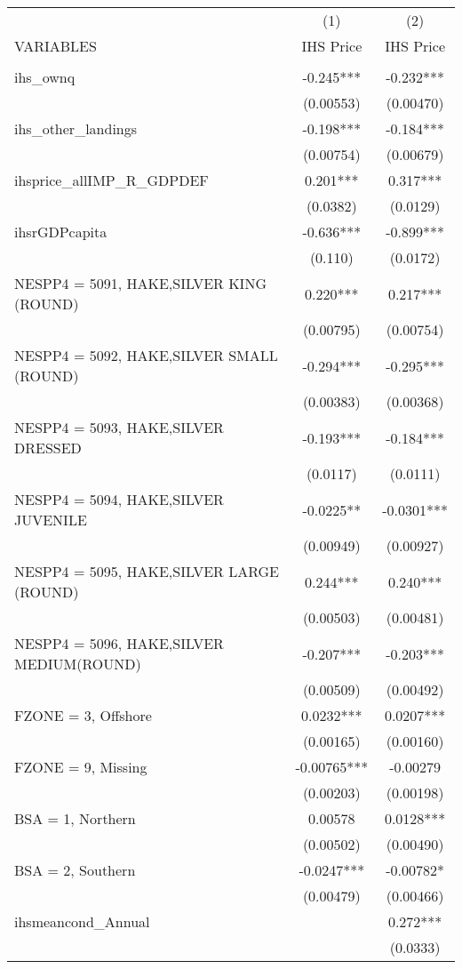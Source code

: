 \begin{tabular}{lcc} \hline
 & (1) & (2) \\
VARIABLES & IHS Price & IHS Price \\ \hline
 &  &  \\
ihs\_ownq & -0.245*** & -0.232*** \\
 & (0.00553) & (0.00470) \\
ihs\_other\_landings & -0.198*** & -0.184*** \\
 & (0.00754) & (0.00679) \\
ihsprice\_allIMP\_R\_GDPDEF & 0.201*** & 0.317*** \\
 & (0.0382) & (0.0129) \\
ihsrGDPcapita & -0.636*** & -0.899*** \\
 & (0.110) & (0.0172) \\
NESPP4 = 5091, HAKE,SILVER KING (ROUND) & 0.220*** & 0.217*** \\
 & (0.00795) & (0.00754) \\
NESPP4 = 5092, HAKE,SILVER SMALL (ROUND) & -0.294*** & -0.295*** \\
 & (0.00383) & (0.00368) \\
NESPP4 = 5093, HAKE,SILVER DRESSED & -0.193*** & -0.184*** \\
 & (0.0117) & (0.0111) \\
NESPP4 = 5094, HAKE,SILVER JUVENILE & -0.0225** & -0.0301*** \\
 & (0.00949) & (0.00927) \\
NESPP4 = 5095, HAKE,SILVER LARGE (ROUND) & 0.244*** & 0.240*** \\
 & (0.00503) & (0.00481) \\
NESPP4 = 5096, HAKE,SILVER MEDIUM(ROUND) & -0.207*** & -0.203*** \\
 & (0.00509) & (0.00492) \\
FZONE = 3, Offshore & 0.0232*** & 0.0207*** \\
 & (0.00165) & (0.00160) \\
FZONE = 9, Missing & -0.00765*** & -0.00279 \\
 & (0.00203) & (0.00198) \\
BSA = 1, Northern & 0.00578 & 0.0128*** \\
 & (0.00502) & (0.00490) \\
BSA = 2, Southern & -0.0247*** & -0.00782* \\
 & (0.00479) & (0.00466) \\
ihsmeancond\_Annual &  & 0.272*** \\
 &  & (0.0333) \\

\end{tabular}
